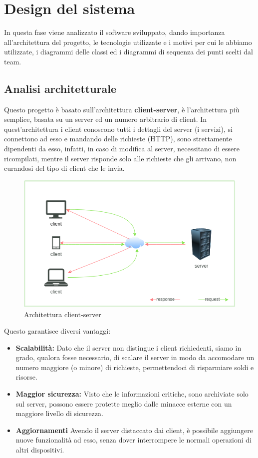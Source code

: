 \section{Design del sistema}
In questa fase viene analizzato il software sviluppato, dando importanza all'architettura del progetto, le tecnologie utilizzate e i motivi per cui le abbiamo utilizzate, i diagrammi delle classi ed i diagrammi di sequenza dei punti scelti dal team.
\subsection{Analisi architetturale}
Questo progetto è basato sull'architettura \textbf{client-server}, è l'architettura più semplice, basata su un server ed un numero arbitrario di client. In quest'architettura i client conoscono tutti i dettagli del server (i servizi), si connettono ad esso e mandando delle richieste (HTTP), sono strettamente dipendenti da esso, infatti, in caso di modifica al server, necessitano di essere ricompilati, mentre il server risponde solo alle richieste che gli arrivano, non curandosi del tipo di client che le invia.
\begin{figure}[H]
  \centering
  \includegraphics[scale=0.8]{img/architectureDesign/Architecture.png}
  \caption{Architettura client-server}
\end{figure}
Questo garantisce diversi vantaggi:
\begin{itemize}
  \item \textbf{Scalabilità:} Dato che il server non distingue i client richiedenti, siamo in grado, qualora fosse necessario, di scalare il server in modo da accomodare un numero maggiore (o minore) di richieste, permettendoci di risparmiare soldi e risorse.
  \item \textbf{Maggior sicurezza:} Visto che le informazioni critiche, sono archiviate solo sul server, possono essere protette meglio dalle minacce esterne con un maggiore livello di sicurezza.
  \item \textbf{Aggiornamenti} Avendo il server distaccato dai client, è possibile aggiungere nuove funzionalità ad esso, senza dover interrompere le normali operazioni di altri dispositivi.
\end{itemize}
\newpage
